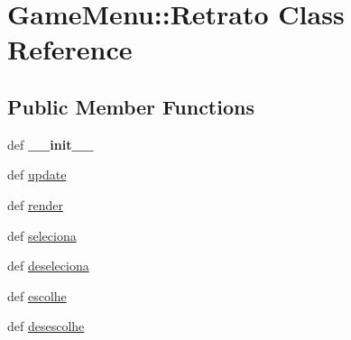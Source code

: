 \hypertarget{class_game_menu_1_1_retrato}{
\section{GameMenu::Retrato Class Reference}
\label{class_game_menu_1_1_retrato}
}
\subsection*{Public Member Functions}
\begin{CompactItemize}
\item 
\hypertarget{class_game_menu_1_1_retrato_9a7d4871911cd3d341679c50bacef8e4}{
def \textbf{\_\-\_\-init\_\-\_\-}}
\label{class_game_menu_1_1_retrato_9a7d4871911cd3d341679c50bacef8e4}

\item 
def \hyperlink{class_game_menu_1_1_retrato_57e91b9027f8e1ea4294c6a4fde49aec}{update}
\item 
def \hyperlink{class_game_menu_1_1_retrato_774994780cf72f28f4e7de593df60f51}{render}
\item 
def \hyperlink{class_game_menu_1_1_retrato_b1d60082873cd5f984602edf3ea9c6b3}{seleciona}
\item 
def \hyperlink{class_game_menu_1_1_retrato_bd603f60d346119ab1865ca121da3578}{deseleciona}
\item 
def \hyperlink{class_game_menu_1_1_retrato_71b7d02732274b0bf496bb66f02f07f5}{escolhe}
\item 
def \hyperlink{class_game_menu_1_1_retrato_ae51d63e97f0d84006ca71fa83abb619}{desescolhe}
\end{CompactItemize}
